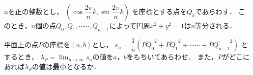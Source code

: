 \documentclass[../../main.tex]{subfiles}
\begin{document}
$n$を正の整数とし，
$\displaystyle \left( \cos\dfrac{2\pi}{n}k,\sin\dfrac{2\pi}{n}k \right)$
を座標とする点を$Q_k$であらわす．
このとき，$n$個の点$Q_0,Q_1,\cdots\cdots,Q_{n-1}$によって円周$x^2+y^2=1$は$n$等分される．

平面上の点$P$の座標を$(a,b)$とし，
$\displaystyle s_n=\dfrac{1}{n}({\overline{PQ_0}}^2+\overline{PQ_1}^2+\cdots\cdots+\overline{PQ_{n-1}}^2)$
とするとき，
$\displaystyle{\lambda}_P=\lim_{n\to\infty}s_n$の値を$a$，$b$をもちいてあらわせ．
また，$P$がどこにあれば${\lambda}_P$の値は最小となるか．
\end{document}
